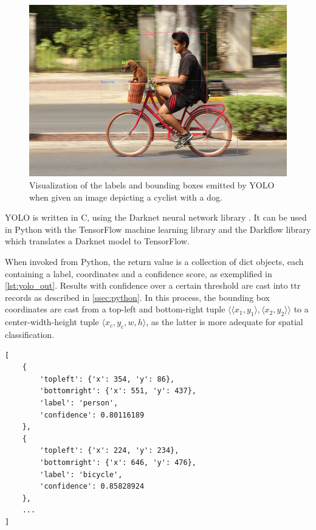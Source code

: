 \begin{figure}[h]
\label{fig:dogbike_annotated}
\includegraphics[width=\textwidth]{dogbike_annotated}
\centering
\caption{Visualization of the labels and bounding boxes emitted by YOLO when given an image depicting a cyclist with a dog.}
\end{figure}

YOLO is written in C, using the Darknet neural network library \citep{darknet13}.
It can be used in Python with the TensorFlow machine learning library and the Darkflow library which translates a Darknet model to TensorFlow.

When invoked from Python, the return value is a collection of dict objects, each containing a label, coordinates and a confidence score, as exemplified in \autoref{lst:yolo_out}.
Results with confidence over a certain threshold are cast into \gls{ttr} records as described in \autoref{ssec:python}.
In this process, the bounding box coordinates are cast from a top-left and bottom-right tuple $\langle\langle x_1, y_1\rangle, \langle x_2, y_2\rangle\rangle$ to a center-width-height tuple $\langle x_c, y_c, w, h\rangle$, as the latter is more adequate for spatial classification.

\begin{lstlisting}[label=lst:yolo_out, caption=Example output of YOLO invocation]
[
	{
		'topleft': {'x': 354, 'y': 86},
		'bottomright': {'x': 551, 'y': 437},
		'label': 'person',
		'confidence': 0.80116189
	},
	{
		'topleft': {'x': 224, 'y': 234},
		'bottomright': {'x': 646, 'y': 476},
		'label': 'bicycle',
		'confidence': 0.85828924
	},
	...
]
\end{lstlisting}



